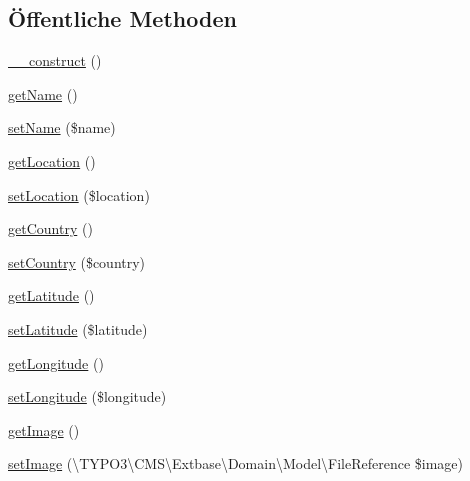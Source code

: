 \subsection*{Öffentliche Methoden}
\begin{DoxyCompactItemize}
\item 
\hyperlink{classCsp_1_1Pinkpoint_1_1Domain_1_1Model_1_1Sector_aab3ad7968b91d6a96312fa30cd2ebc87}{\+\_\+\+\_\+construct} ()
\item 
\hyperlink{classCsp_1_1Pinkpoint_1_1Domain_1_1Model_1_1Sector_a973de92037566bfc116dbd35292ae845}{get\+Name} ()
\item 
\hyperlink{classCsp_1_1Pinkpoint_1_1Domain_1_1Model_1_1Sector_a0a9ba33bd1f01179e5b364c68f6b88c9}{set\+Name} (\$name)
\item 
\hyperlink{classCsp_1_1Pinkpoint_1_1Domain_1_1Model_1_1Sector_a05729a4cf4d3efb4b466b3c3a39b7950}{get\+Location} ()
\item 
\hyperlink{classCsp_1_1Pinkpoint_1_1Domain_1_1Model_1_1Sector_a7f0167fdba5e50a416a4be8368df4d6b}{set\+Location} (\$location)
\item 
\hyperlink{classCsp_1_1Pinkpoint_1_1Domain_1_1Model_1_1Sector_a4f6a2326d46c4b19ba90638296c31721}{get\+Country} ()
\item 
\hyperlink{classCsp_1_1Pinkpoint_1_1Domain_1_1Model_1_1Sector_ad1667356abec39da2b4931f168b727dd}{set\+Country} (\$country)
\item 
\hyperlink{classCsp_1_1Pinkpoint_1_1Domain_1_1Model_1_1Sector_aa4c34048db30b12bb1dd99f9c3b41f3e}{get\+Latitude} ()
\item 
\hyperlink{classCsp_1_1Pinkpoint_1_1Domain_1_1Model_1_1Sector_ad6d2cf28223ccd7ccf04662c5530f2a2}{set\+Latitude} (\$latitude)
\item 
\hyperlink{classCsp_1_1Pinkpoint_1_1Domain_1_1Model_1_1Sector_a5dd881958a7bb14b752b76db77932775}{get\+Longitude} ()
\item 
\hyperlink{classCsp_1_1Pinkpoint_1_1Domain_1_1Model_1_1Sector_a4ed5f1b7bb753e5533b5caa2722769fe}{set\+Longitude} (\$longitude)
\item 
\hyperlink{classCsp_1_1Pinkpoint_1_1Domain_1_1Model_1_1Sector_a896fb9d791d1527980d11b3c85fe52b3}{get\+Image} ()
\item 
\hyperlink{classCsp_1_1Pinkpoint_1_1Domain_1_1Model_1_1Sector_a813ad1e71b62046d2b88b71b156b45ba}{set\+Image} (\textbackslash{}T\+Y\+P\+O3\textbackslash{}\+C\+M\+S\textbackslash{}\+Extbase\textbackslash{}\+Domain\textbackslash{}\+Model\textbackslash{}\+File\+Reference \$image)
\item 

\end{DoxyCompactItemize}

